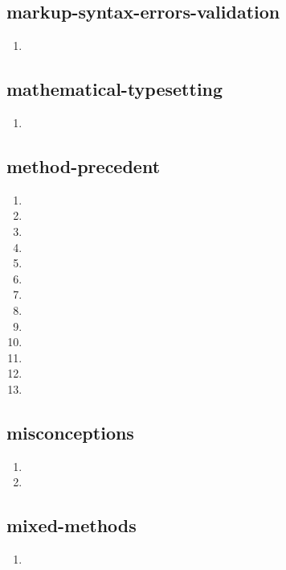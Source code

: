 \documentclass{article}
\begin{document}
\subsection{markup-syntax-errors-validation}
\begin{enumerate}
\item {}
\end{enumerate}

\subsection{mathematical-typesetting}
\begin{enumerate}
\item {}
\end{enumerate}

\subsection{method-precedent}
\begin{enumerate}
\item {}
\item {}
\item {}
\item {}
\item {}
\item {}
\item {}
\item {}
\item {}
\item {}
\item {}
\item {}
\item {}
\end{enumerate}

\subsection{misconceptions}
\begin{enumerate}
\item {}
\item {}
\end{enumerate}

\subsection{mixed-methods}
\begin{enumerate}
\item {}
\end{enumerate}
\end{document}
